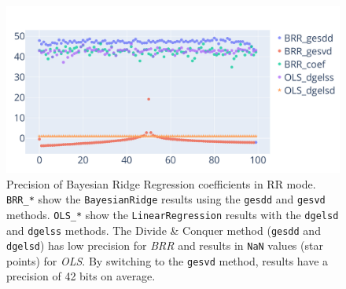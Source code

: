 \documentclass[10pt,journal,compsoc]{IEEEtran}
\begin{document}
\begin{figure}
    \centering
    \includegraphics[width=\linewidth]{figure/BRR/BRR_coefs_sig.pdf}
    \caption{Precision of Bayesian Ridge Regression coefficients in RR mode.
        \texttt{BRR\_*} show the \texttt{BayesianRidge} results
        using the \texttt{gesdd} and \texttt{gesvd} methods. 
        \texttt{OLS\_*} show the \texttt{LinearRegression} results
        with the \texttt{dgelsd} and \texttt{dgelss} methods.
        The Divide \& Conquer method 
        (\texttt{gesdd} and  \texttt{dgelsd})
        has low precision
        for \textit{BRR} and results in \texttt{NaN} values (star points) for \textit{OLS}. By switching to the \texttt{gesvd} method, 
        results have a precision of 42 bits on average.
    }
    \label{fig:brr_svd_sig}
\end{figure}



\end{document}
